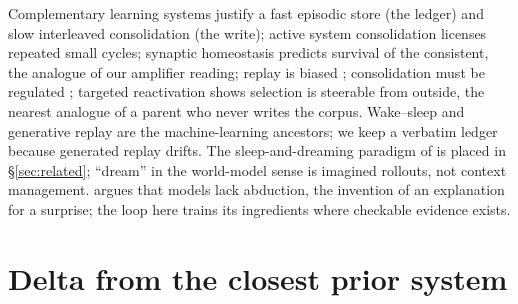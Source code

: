 \documentclass{article}
\begin{document}
Complementary learning systems \citep{mcclelland1995cls} justify a fast episodic store (the ledger) and slow interleaved consolidation (the write); active system consolidation \citep{diekelmann2010sleep} licenses repeated small cycles; synaptic homeostasis \citep{tononi2014sleep} predicts survival of the consistent, the analogue of our amplifier reading; replay is biased \citep{buzsaki2015swr}; consolidation must be regulated \citep{sun2023organizing}; targeted reactivation \citep{oudiette2013tmr} shows selection is steerable from outside, the nearest analogue of a parent who never writes the corpus. Wake--sleep \citep{hinton1995wakesleep} and generative replay \citep{shin2017replay,arani2022clser} are the machine-learning ancestors; we keep a verbatim ledger because generated replay drifts. The sleep-and-dreaming paradigm of \citet{behrouz2026sleep} is placed in \S\ref{sec:related}; ``dream'' in the world-model sense \citep{hafner2023dreamerv3,nottingham2023deckard} is imagined rollouts, not context management. \citet{zahavy2026jump} argues that models lack abduction, the invention of an explanation for a surprise; the loop here trains its ingredients where checkable evidence exists.

\section{Delta from the closest prior system}
\label{app:delta}
\end{document}
